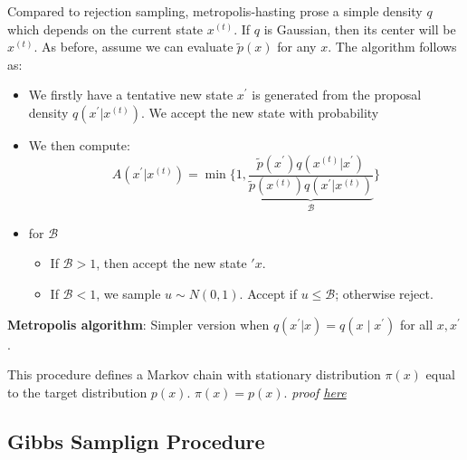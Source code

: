 Compared to rejection sampling, metropolis-hasting prose a simple density $q$ which depends on the current state $x^{(t)}$. If $q$ is Gaussian, then its center will be $x^{(t)}$. As before, assume we can evaluate $\tilde{p}(x)$ for any $x$. The algorithm follows as:
\begin{itemize}
    \item We firstly have a tentative new state $x^{\prime}$ is generated from the proposal density $q\left(x^{\prime} | x^{(t)}\right)$. We accept the new state with probability
    \item We then compute:
    $$
    A\left(x^{\prime}|x^{(t)}\right)=\min \Biggl\{1, \underbrace{\frac{\tilde{p}\left(x^{\prime}\right) q\left(x^{(t)}|x^{\prime}\right)}{\tilde{p}\left(x^{(t)}\right) q\left(x^{\prime} | x^{(t)}\right)}}_{\mathcal{B}}\Biggl\}
    $$
    \item for $\mathcal{B}$
    \begin{itemize}
        \item If $\mathcal{B}>1$, then accept the new state $\prime{x}$.
        \item If $\mathcal{B}<1$, we sample $u\sim N(0,1)$. Accept if $u\leq\mathcal{B}$; otherwise reject.
    \end{itemize}
\end{itemize}
\textbf{Metropolis algorithm}: Simpler version when $q\left(x^{\prime} | x\right)=q\left(x \mid x^{\prime}\right)$ for all $x, x^{\prime}$.
\begin{theorem}
    This procedure defines a Markov chain with stationary distribution $\pi(x)$ equal to the target distribution $p(x)$. $\pi(x)=p(x)$. \textit{proof \hyperref[sec:proof-metro]{here}}
\end{theorem}

\subsection{Gibbs Samplign Procedure}